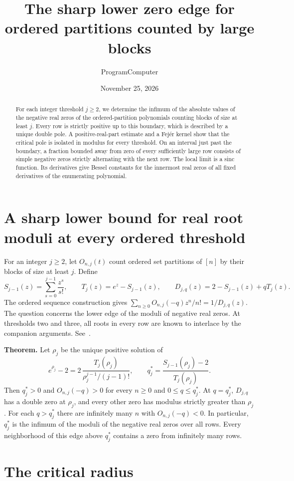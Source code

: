 \documentclass[11pt]{article}
\title{The sharp lower zero edge for ordered partitions counted by large blocks}
\author{ProgramComputer}
\date{November 25, 2026}
\begin{document}
\maketitle
\begin{abstract}
For each integer threshold $j\ge2$, we determine the infimum of the absolute values of the negative real zeros of the ordered-partition polynomials counting blocks of size at least $j$. Every row is strictly positive up to this boundary, which is described by a unique double pole. A positive-real-part estimate and a Fej\'er kernel show that the critical pole is isolated in modulus for every threshold. On an interval just past the boundary, a fraction bounded away from zero of every sufficiently large row consists of simple negative zeros strictly alternating with the next row. The local limit is a sinc function. Its derivatives give Bessel constants for the innermost real zeros of all fixed derivatives of the enumerating polynomial.
\end{abstract}
\section{A sharp lower bound for real root moduli at every ordered threshold}

For an integer $j\ge2$, let $O_{n,j}(t)$ count ordered set partitions of $[n]$ by their blocks of size at least $j$. Define
\[
S_{j-1}(z)=\sum_{s=0}^{j-1}\frac{z^s}{s!},\qquad
T_j(z)=e^z-S_{j-1}(z),\qquad
D_{j,q}(z)=2-S_{j-1}(z)+qT_j(z).
\]
The ordered sequence construction gives $\sum_{n\ge0}O_{n,j}(-q)z^n/n!=1/D_{j,q}(z)$. The question concerns the lower edge of the moduli of negative real zeros. At thresholds two and three, all roots in every row are known to interlace by the companion arguments. See~\cite{original,companion}.

\textbf{Theorem.} Let $\rho_j$ be the unique positive solution of
\[
e^{\rho_j}-2=2\,\frac{T_j(\rho_j)}{\rho_j^{j-1}/(j-1)!},
\qquad
 q_j^*=\frac{S_{j-1}(\rho_j)-2}{T_j(\rho_j)}.
\]
Then $q_j^*>0$ and $O_{n,j}(-q)>0$ for every $n\ge0$ and $0\le q\le q_j^*$. At $q=q_j^*$, $D_{j,q}$ has a double zero at $\rho_j$, and every other zero has modulus strictly greater than $\rho_j$. For each $q>q_j^*$ there are infinitely many $n$ with $O_{n,j}(-q)<0$. In particular, $q_j^*$ is the infimum of the moduli of the negative real zeros over all rows. Every neighborhood of this edge above $q_j^*$ contains a zero from infinitely many rows.

\section{The critical radius}
\end{document}
